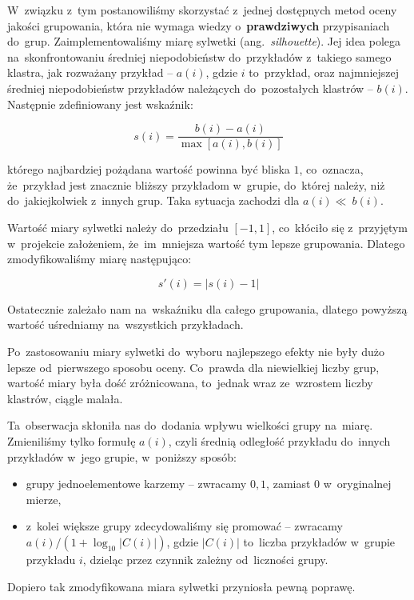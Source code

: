 \documentclass[a4paper,12pt]{mwart}
\newcommand{\ang}[1]{ang.~{\itshape #1}}
\begin{document}
W~związku z~tym postanowiliśmy skorzystać z~jednej dostępnych metod oceny
jakości grupowania, która nie wymaga wiedzy o~\textbf{prawdziwych}
przypisaniach do~grup. Zaimplementowaliśmy miarę sylwetki (\ang{silhouette}).
Jej idea polega na~skonfrontowaniu średniej niepodobieństw do~przykładów
z~takiego samego klastra, jak rozważany przykład -- $a(i)$, gdzie $i$
to~przykład, oraz najmniejszej średniej niepodobieństw przykładów należących
do~pozostałych klastrów -- $b(i)$. Następnie zdefiniowany jest wskaźnik:

\[s(i) = \frac{b(i) - a(i)}{\max[a(i), b(i)]}\]

którego najbardziej pożądana wartość powinna być bliska $1$, co~oznacza,
że~przykład jest znacznie bliższy przykładom w~grupie, do~której należy, niż
do~jakiejkolwiek z~innych grup. Taka sytuacja zachodzi dla $a(i) \ll~b(i)$.

Wartość miary sylwetki należy do~przedziału $[-1, 1]$, co~kłóciło się
z~przyjętym w~projekcie założeniem, że~im~mniejsza wartość tym lepsze
grupowania. Dlatego zmodyfikowaliśmy miarę następująco:

\[s'(i) = \left | s(i) - 1 \right | \]

Ostatecznie zależało nam na~wskaźniku dla całego grupowania, dlatego powyższą
wartość uśredniamy na~wszystkich przykładach.

Po~zastosowaniu miary sylwetki do~wyboru najlepszego efekty nie były dużo
lepsze od~pierwszego sposobu oceny. Co~prawda dla niewielkiej liczby grup,
wartość miary była dość zróżnicowana, to~jednak wraz ze~wzrostem liczby
klastrów, ciągle malała.

Ta~obserwacja skłoniła nas do~dodania wpływu wielkości grupy na~miarę.
Zmieniliśmy tylko formułę $a(i)$, czyli średnią odległość przykładu do~innych
przykładów w~jego grupie, w~poniższy sposób:

\begin{itemize}
\item grupy jednoelementowe karzemy -- zwracamy $0{,}1$, zamiast $0$
  w~oryginalnej mierze,
\item z~kolei większe grupy zdecydowaliśmy się promować -- zwracamy $a(i) /
  \left (1 + \log_{10} \left | C(i) \right | \right)$, gdzie $\left | C(i)
  \right |$ to~liczba przykładów w~grupie przykładu $i$, dzieląc przez czynnik
  zależny od~liczności grupy.
\end{itemize}

Dopiero tak zmodyfikowana miara sylwetki przyniosła pewną poprawę.
\end{document}
